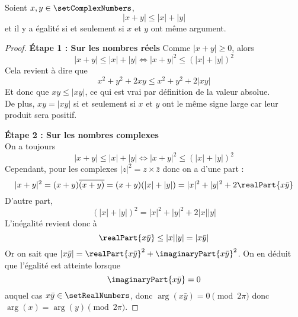 \begin{theorem}
\label{inegalite_triangulaire}
Soient $x, y \in \setComplexNumbers$, 
\[
|x+y| \le |x| + |y|
\]
et il y a égalité si et seulement si $x$ et $y$ ont même argument.
\end{theorem}

\begin{proof}
\textbf{Étape 1 : Sur les nombres réels} Comme $|x+y| \ge 0$, alors
\[
|x+y| \le |x|+|y| \Leftrightarrow |x+y|^2 \le \left(|x|+|y|\right)^2
\]
Cela revient à dire que
\[
x^2+y^2+2xy \le x^2+y^2+2|xy|
\]
Et donc que $xy\le |xy|$, ce qui est vrai par définition de la valeur absolue.\\
De plus, $xy = |xy|$ si et seulement si $x$ et $y$ ont le même signe large car leur produit sera positif.

\textbf{Étape 2 : Sur les nombres complexes} \\
On a toujours 
\[
|x+y| \le |x|+|y| \Leftrightarrow |x+y|^2 \le \left(|x|+|y|\right)^2
\]
Cependant, pour les complexes $|z|^2=z\times \bar{z}$ donc on a d'une part :
\[
|x+y|^2 = (x+y)\overline{(x+y)} =  (x+y)(|x|+|y|) = |x|^2 + |y|^2 + 2 \realPart{x \bar{y}}
\]
D'autre part,  
\[
(|x|+ |y|)^2 = |x|^2 + |y|^2 + 2 |x||y|
\]
L'inégalité revient donc à 
\[
\realPart{x \bar{y}} \le |x||y| = |x\bar{y}|
\]
Or on sait que $|x\bar{y}| = \realPart{x\bar{y}}^2 + \imaginaryPart{x\bar{y}}^2$. On en déduit que l'égalité est atteinte lorsque
\[
\imaginaryPart{x\bar{y}} = 0
\]
auquel cas $x\bar{y} \in \setRealNumbers$, donc $\arg(x\bar{y}) = 0 \pmod{2\pi}$ donc $\arg(x) = \arg(y) \pmod{2\pi}$.
\end{proof}